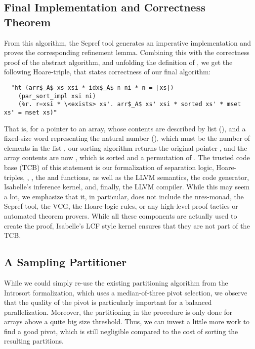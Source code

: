 \documentclass[runningheads]{llncs}
\begin{document}
  \subsection{Final Implementation and Correctness Theorem}
  From this algorithm, the Sepref tool generates an imperative implementation  and proves the corresponding  refinement lemma.
  Combining this with the correctness proof of the abstract  algorithm, and unfolding the definition of ,
  we get the following Hoare-triple, that states correctness of our final algorithm:
  \begin{lstlisting}
  "ht (arr$_A$ xs xsi * idx$_A$ n ni * n = |xs|)
    (par_sort_impl xsi ni)
    (%r. r=xsi * \<exists> xs'. arr$_A$ xs' xsi * sorted xs' * mset xs' = mset xs)"
  \end{lstlisting}
  That is, for a pointer  to an array, whose contents are described by list  (), and a fixed-size word  representing the natural number  (),
  which must be the number of elements in the list , our sorting algorithm returns the original pointer , and the array contents are now ,
  which is sorted and a permutation of . The trusted code base (TCB) of this statement is our
  formalization of separation logic, Hoare-triples, , , the  and  functions,
  as well as the LLVM semantics, the code generator, Isabelle's inference kernel, and, finally, the LLVM compiler.
  While this may seem a lot, we emphasize that it, in particular, does not include the nres-monad, the Sepref tool, the VCG,
  the Hoare-logic rules, or any high-level proof tactics or automated theorem provers. While all these components are actually used to create the proof,
  Isabelle's LCF style kernel ensures that they are not part of the TCB.

  \subsection{A Sampling Partitioner}
  While we could simply re-use the existing partitioning algorithm from the Introsort formalization,
  which uses a median-of-three pivot selection, we observe that the quality of the pivot is
  particularly important for a balanced parallelization. Moreover, the partitioning in the  procedure
  is only done for arrays above a quite big size threshold. Thus, we can invest a little more work to find
  a good pivot, which is still negligible compared to the cost of sorting the resulting partitions.
\end{document}
